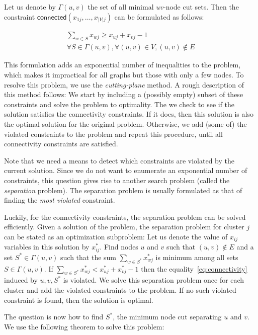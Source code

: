 \documentclass[conference,compsoc]{IEEEtran}
\begin{document}
Let us denote by $\Gamma(u, v)$ the set of all minimal $uv$-node cut sets. Then the constraint $\mathsf{connected}(x_{1j}, \ldots, x_{|V|j})$ can be formulated as follows:

\begin{multline}
\sum_{w \in S} x_{wj} \geq x_{uj} + x_{vj} - 1 \\
\forall S \in \Gamma(u, v), \forall (u, v) \in V, (u, v) \notin E
\label{eq:connectivity}
\end{multline}

This formulation adds an exponential number of inequalities to the
problem, which makes it impractical for all graphs but those with only a
few nodes. To resolve this problem, we use the \emph{cutting-plane}
method. A rough description of this method follows: We start by
including a (possibly empty) subset of these constraints and solve the
problem to optimality. The we check to see if the solution satisfies the
connectivity constraints. If it does, then this solution is also the
optimal solution for the original problem. Otherwise, we add (some of)
the violated constraints to the problem and repeat this procedure, until
all connectivity constraints are satisfied.

Note that we need a means to detect which constraints are violated by
the current solution. Since we do not want to enumerate an exponential
number of constraints, this question gives rise to another search
problem (called the \emph{separation} problem). The separation problem
is usually formulated as that of finding the \emph{most violated}
constraint.

Luckily, for the connectivity constraints, the separation problem can be
solved efficiently. Given a solution of the problem, the
separation problem for cluster $j$ can be stated as an optimization subproblem: Let us denote the value of $x_{ij}$ variables in this solution by $x^*_{ij}$. Find nodes $u$ and $v$ such that $(u, v) \notin E$ and a set $S^* \in \Gamma(u, v)$ such that the sum $\sum_{w \in S^*} x_{wj}^*$ is
minimum among all sets $S \in \Gamma(u, v)$. If $\sum_{w \in S^*} x_{wj}^* < x^*_{uj} + x^*_{vj} - 1$ then the equality~\ref{eq:connectivity}
induced by $u, v, S^*$ is violated. We solve this separation problem
once for each cluster and add the violated constraints to the problem.
If no such violated constraint is found, then the solution is optimal.

The question is now how to find $S^*$, the minimum node cut separating
$u$ and $v$. We use the following theorem to solve this problem:
\end{document}
